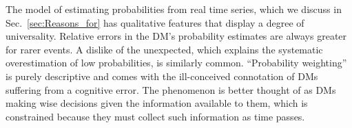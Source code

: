 \documentclass[a4paper, 12pt]{article}
\newcommand{\eref}[1]{(Eq.~\ref{eq:#1})}
\newcommand{\secref}[1]{Sec.~\ref{sec:#1}}
\newcommand{\OP}[1]{{\it ***OP: #1 OP***}}
\begin{document}
%
The model of estimating probabilities from real time series, which we discuss in \secref{Reasons_for} has qualitative features that display a degree of universality. Relative errors in the DM's probability estimates are always greater for rarer events. A dislike of the unexpected, which explains the systematic overestimation of low probabilities, is similarly common. ``Probability weighting'' is purely descriptive and comes with the ill-conceived connotation of DMs suffering from a cognitive error. The phenomenon is better thought of as DMs making wise decisions given the information available to them, which is constrained because they must collect such information as time passes.

% 
% 
% 
% 

\end{document}
